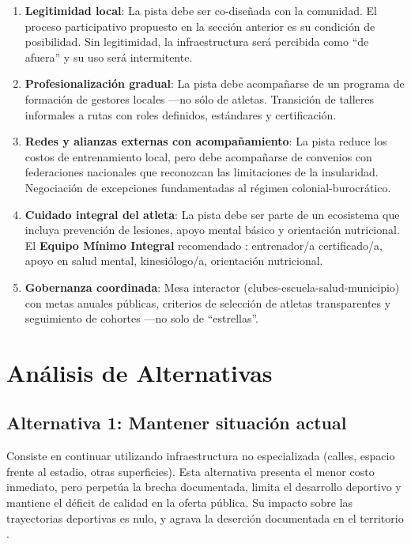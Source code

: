 \documentclass[12pt, a4paper]{article}
\begin{document}
\begin{enumerate}[leftmargin=*, itemsep=8pt]
  \item \textbf{Legitimidad local}: La pista debe ser co-diseñada con la comunidad.
    El proceso participativo propuesto en la sección anterior es su condición de
    posibilidad. Sin legitimidad, la infraestructura será percibida como ``de
    afuera'' y su uso será intermitente.

  \item \textbf{Profesionalización gradual}: La pista debe acompañarse de un
    programa de formación de gestores locales ---no sólo de atletas. Transición
    de talleres informales a rutas con roles definidos, estándares y certificación.

  \item \textbf{Redes y alianzas externas con acompañamiento}: La pista reduce
    los costos de entrenamiento local, pero debe acompañarse de convenios con
    federaciones nacionales que reconozcan las limitaciones de la insularidad.
    Negociación de excepciones fundamentadas al régimen colonial-burocrático.

  \item \textbf{Cuidado integral del atleta}: La pista debe ser parte de un
    ecosistema que incluya prevención de lesiones, apoyo mental básico y
    orientación nutricional. El \textbf{Equipo Mínimo Integral} recomendado
    \citep{ortega2026}: entrenador/a certificado/a, apoyo en salud mental,
    kinesiólogo/a, orientación nutricional.

  \item \textbf{Gobernanza coordinada}: Mesa interactor (clubes-escuela-salud-municipio)
    con metas anuales públicas, criterios de selección de atletas transparentes
    y seguimiento de cohortes ---no solo de ``estrellas''.
\end{enumerate}

\section{Análisis de Alternativas}

\subsection{Alternativa 1: Mantener situación actual}

Consiste en continuar utilizando infraestructura no especializada (calles,
espacio frente al estadio, otras superficies). Esta alternativa presenta el
menor costo inmediato, pero perpetúa la brecha documentada, limita el
desarrollo deportivo y mantiene el déficit de calidad en la oferta pública.
Su impacto sobre las trayectorias deportivas es nulo, y agrava la deserción
documentada en el territorio \citep{ortega2026}.
\end{document}
